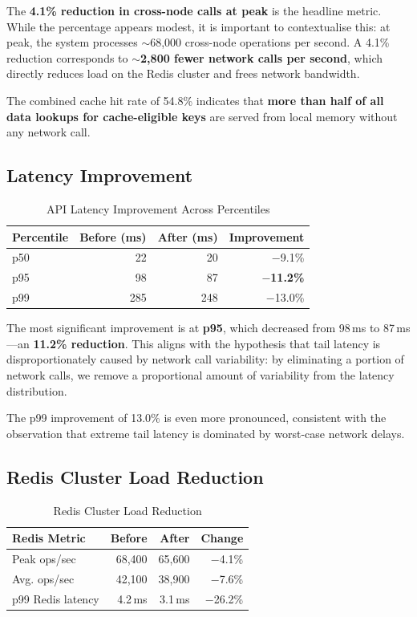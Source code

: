 \documentclass[12pt,a4paper]{report}
\begin{document}
The \textbf{4.1\% reduction in cross-node calls at peak} is the headline metric. While the percentage appears modest, it is important to contextualise this: at peak, the system processes $\sim$68,000 cross-node operations per second. A 4.1\% reduction corresponds to \textbf{$\sim$2,800 fewer network calls per second}, which directly reduces load on the Redis cluster and frees network bandwidth.

The combined cache hit rate of 54.8\% indicates that \textbf{more than half of all data lookups for cache-eligible keys} are served from local memory without any network call.

\subsection{Latency Improvement}

\begin{table}[h]
\centering
\begin{tabular}{@{} l r r r @{}}
\toprule
\textbf{Percentile} & \textbf{Before (ms)} & \textbf{After (ms)} & \textbf{Improvement} \\
\midrule
p50 & 22 & 20 & $-$9.1\% \\
p95 & 98 & 87 & $-$\textbf{11.2\%} \\
p99 & 285 & 248 & $-$13.0\% \\
\bottomrule
\end{tabular}
\caption{API Latency Improvement Across Percentiles}
\label{tab:latency-improvement}
\end{table}

The most significant improvement is at \textbf{p95}, which decreased from 98\,ms to 87\,ms—an \textbf{11.2\% reduction}. This aligns with the hypothesis that tail latency is disproportionately caused by network call variability: by eliminating a portion of network calls, we remove a proportional amount of variability from the latency distribution.

The p99 improvement of 13.0\% is even more pronounced, consistent with the observation that extreme tail latency is dominated by worst-case network delays.

\subsection{Redis Cluster Load Reduction}

\begin{table}[h]
\centering
\begin{tabular}{@{} l r r r @{}}
\toprule
\textbf{Redis Metric} & \textbf{Before} & \textbf{After} & \textbf{Change} \\
\midrule
Peak ops/sec & 68,400 & 65,600 & $-$4.1\% \\
Avg. ops/sec & 42,100 & 38,900 & $-$7.6\% \\
p99 Redis latency & 4.2\,ms & 3.1\,ms & $-$26.2\% \\
\bottomrule
\end{tabular}
\caption{Redis Cluster Load Reduction}
\label{tab:redis-load}
\end{table}
\end{document}
